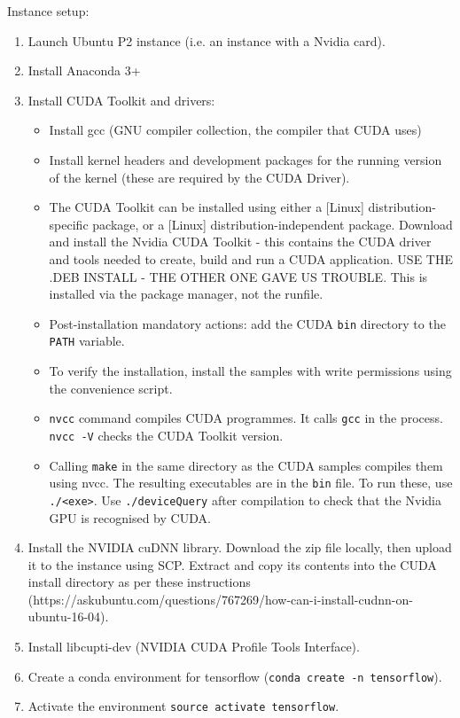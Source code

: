 \documentclass[idxtotoc,hyperref,openany]{labbook} %
\begin{document}
Instance setup:
\begin{enumerate}
	\item Launch Ubuntu P2 instance (i.e. an instance with a Nvidia card).
	\item Install Anaconda 3+
	\item Install CUDA Toolkit and drivers:
	\begin{itemize}
	\item Install gcc (GNU compiler collection, the compiler that CUDA uses)
	\item Install kernel headers and development packages for the running version of the kernel (these are required by the CUDA Driver).
	\item The CUDA Toolkit can be installed using either a [Linux] distribution-specific package, or a [Linux] distribution-independent package. Download and install the Nvidia CUDA Toolkit - this contains the CUDA driver and tools needed to create, build and run a CUDA application. USE THE .DEB INSTALL - THE OTHER ONE GAVE US TROUBLE. This is installed via the package manager, not the runfile.
	\item Post-installation mandatory actions: add the CUDA \texttt{bin} directory to the \texttt{PATH} variable.
	\item To verify the installation, install the samples with write permissions using the convenience script.
	\item \texttt{nvcc} command compiles CUDA programmes. It calls \texttt{gcc} in the process. \texttt{nvcc -V} checks the CUDA Toolkit version.
	\item Calling \texttt{make} in the same directory as the CUDA samples compiles them using nvcc. The resulting executables are in the \texttt{bin} file. To run these, use \texttt{./<exe>}. Use \texttt{./deviceQuery} after compilation to check that the Nvidia GPU is recognised by CUDA.
	\end{itemize}
	\item Install the NVIDIA cuDNN library. Download the zip file locally, then upload it to the instance using SCP. Extract and copy its contents into the CUDA install directory as per these instructions (https://askubuntu.com/questions/767269/how-can-i-install-cudnn-on-ubuntu-16-04).
	\item  Install libcupti-dev (NVIDIA CUDA Profile Tools Interface).
	\item Create a conda environment for tensorflow (\texttt{conda create -n tensorflow}).
	\item Activate the environment \texttt{source activate tensorflow}.

\end{enumerate}
\end{document}
